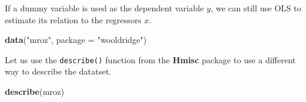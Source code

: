 \documentclass[]{book}
\newenvironment{Shaded}{\begin{snugshade}}{\end{snugshade}}
\newcommand{\DataTypeTok}[1]{\textcolor[rgb]{0.13,0.29,0.53}{#1}}
\newcommand{\KeywordTok}[1]{\textcolor[rgb]{0.13,0.29,0.53}{\textbf{#1}}}
\newcommand{\NormalTok}[1]{#1}
\newcommand{\StringTok}[1]{\textcolor[rgb]{0.31,0.60,0.02}{#1}}
\begin{document}
If a dummy variable is used as the dependent variable \(y\), we can still use OLS to estimate its relation to the regressors \(x\).

\begin{Shaded}
\begin{Highlighting}[]
\KeywordTok{data}\NormalTok{(}\StringTok{"mroz"}\NormalTok{, }\DataTypeTok{package =} \StringTok{"wooldridge"}\NormalTok{)}
\end{Highlighting}
\end{Shaded}

Let us use the \texttt{describe()} function from the \textbf{Hmisc} package to use a different way to describe the datatset.

\begin{Shaded}
\begin{Highlighting}[]
\KeywordTok{describe}\NormalTok{(mroz)}
\end{Highlighting}
\end{Shaded}

 
  \providecommand{\huxb}[2]{\arrayrulecolor[RGB]{#1}\global\arrayrulewidth=#2pt}
  \providecommand{\huxvb}[2]{\color[RGB]{#1}\vrule width #2pt}
  \providecommand{\huxtpad}[1]{\rule{0pt}{\baselineskip+#1}}
  \providecommand{\huxbpad}[1]{\rule[-#1]{0pt}{#1}}
\end{document}
